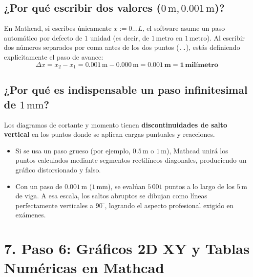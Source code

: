 \documentclass[10pt,a4paper]{article}
\begin{document}
\subsection{¿Por qué escribir dos valores ($0\,\text{m}, 0.001\,\text{m}$)?}
En Mathcad, si escribes únicamente $x := 0 \dots L$, el software asume un paso automático por defecto de $1$ unidad (es decir, de $1\,\text{metro}$ en $1\,\text{metro}$). Al escribir dos números separados por coma antes de los dos puntos (\texttt{..}), estás definiendo explícitamente el paso de avance:
\[
\Delta x = x_2 - x_1 = 0.001\,\text{m} - 0.000\,\text{m} = \mathbf{0.001\,\text{m} = 1\,\text{milímetro}}
\]

\subsection{¿Por qué es indispensable un paso infinitesimal de $1\,\text{mm}$?}
Los diagramas de cortante y momento tienen \textbf{discontinuidades de salto vertical} en los puntos donde se aplican cargas puntuales y reacciones.
\begin{itemize}[leftmargin=*,itemsep=1pt]
    \item Si se usa un paso grueso (por ejemplo, $0.5\,\text{m}$ o $1\,\text{m}$), Mathcad unirá los puntos calculados mediante segmentos rectilíneos diagonales, produciendo un gráfico distorsionado y falso.
    \item Con un paso de $0.001\,\text{m}$ ($1\,\text{mm}$), se evalúan $5\,001$ puntos a lo largo de los $5\,\text{m}$ de viga. A esa escala, los saltos abruptos se dibujan como líneas perfectamente verticales a $90^\circ$, logrando el aspecto profesional exigido en exámenes.
\end{itemize}

\vspace{6pt}

\section{\color{NavyBlue}7. Paso 6: Gráficos 2D XY y Tablas Numéricas en Mathcad}
\end{document}
